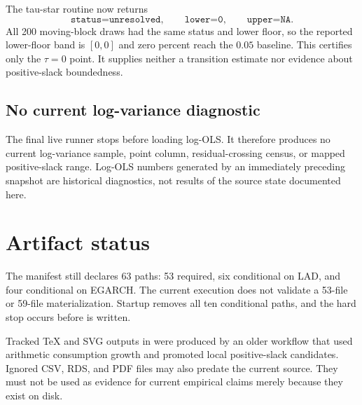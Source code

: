 \documentclass[11pt]{article}
\begin{document}
The tau-star routine now returns
\[
  \texttt{status=unresolved},\qquad
  \texttt{lower=0},\qquad
  \texttt{upper=NA}.
\]
All 200 moving-block draws had the same status and lower floor, so the reported
lower-floor band is $[0,0]$ and zero percent reach the $0.05$ baseline. This
certifies only the $\tau=0$ point. It supplies neither a transition estimate
nor evidence about positive-slack boundedness.

\subsection{No current log-variance diagnostic}

The final live runner stops before loading log-OLS. It therefore produces no
current log-variance sample, point column, residual-crossing census, or mapped
positive-slack range. Log-OLS numbers generated by an immediately preceding
snapshot are historical diagnostics, not results of the source state
documented here.

\section{Artifact status}

The manifest still declares 63 paths: 53 required, six conditional on LAD,
and four conditional on EGARCH. The current execution does not validate a
53-file or 59-file materialization. Startup removes all ten conditional paths,
and the hard stop occurs before
 is written.

Tracked TeX and SVG outputs in  were produced by
an older workflow that used arithmetic consumption growth and promoted local
positive-slack candidates. Ignored CSV, RDS, and PDF files may also predate
the current source. They must not be used as evidence for current empirical
claims merely because they exist on disk.
\end{document}
